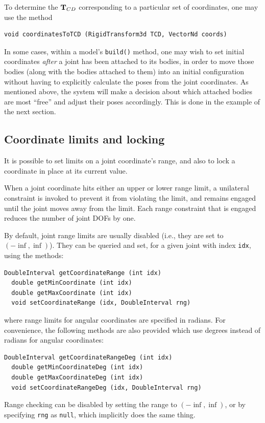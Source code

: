 To determine the ${\bf T}_{CD}$ corresponding to a particular set of
coordinates, one may use the method
\begin{lstlisting}[]
  void coordinatesToTCD (RigidTransform3d TCD, VectorNd coords)
\end{lstlisting}
%

In some cases, within a model's {\tt build()} method, one may wish to
set initial coordinates {\it after} a joint has been attached to its
bodies, in order to move those bodies (along with the bodies attached
to them) into an initial configuration without having to explicitly
calculate the poses from the joint coordinates. As mentioned
above, the system will make a decision about which attached bodies are
most ``free'' and adjust their poses accordingly. This is done in the
example of the next section.

\subsection{Coordinate limits and locking}
\label{coordinateLimitsAndLocking:sec}

It is possible to set limits on a joint coordinate's range, and also
to lock a coordinate in place at its current value.

When a joint coordinate hits either an upper or lower range limit, a
unilateral constraint is invoked to prevent it from violating the
limit, and remains engaged until the joint moves away from the
limit. Each range constraint that is engaged reduces the number of
joint DOFs by one.

By default, joint range limits are usually disabled (i.e., they are
set to $(-\inf, \inf)$). They can be queried and set, for a given
joint with index {\tt idx}, using the methods:
\begin{lstlisting}[]
  DoubleInterval getCoordinateRange (int idx)	
  double getMinCoordinate (int idx)
  double getMaxCoordinate (int idx)
  void setCoordinateRange (idx, DoubleInterval rng)
\end{lstlisting}
%
where range limits for angular coordinates are specified in
radians. For convenience, the following methods are also provided
which use degrees instead of radians for angular coordinates:
\begin{lstlisting}[]
  DoubleInterval getCoordinateRangeDeg (int idx)
  double getMinCoordinateDeg (int idx)
  double getMaxCoordinateDeg (int idx)
  void setCoordinateRangeDeg (idx, DoubleInterval rng)
\end{lstlisting}
%
Range checking can be disabled by setting the range to
$(-\inf, \inf)$, or by specifying {\tt rng} as {\tt null}, which
implicitly does the same thing.

